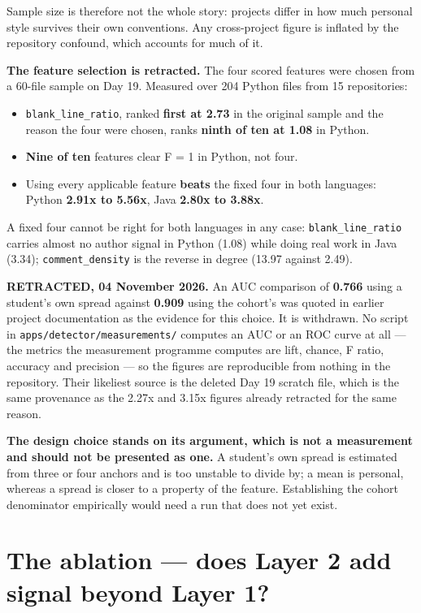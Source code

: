 Sample size is therefore not the whole story: projects differ in how
much personal style survives their own conventions. Any cross-project
figure is inflated by the repository confound, which accounts for much
of it.

\textbf{The feature selection is retracted.} The four scored features
were chosen from a 60-file sample on Day 19. Measured over 204 Python
files from 15 repositories:

\begin{itemize}
\tightlist
\item
  \texttt{blank\_line\_ratio}, ranked \textbf{first at 2.73} in the
  original sample and the reason the four were chosen, ranks
  \textbf{ninth of ten at 1.08} in Python.
\item
  \textbf{Nine of ten} features clear F = 1 in Python, not four.
\item
  Using every applicable feature \textbf{beats} the fixed four in both
  languages: Python \textbf{2.91x to 5.56x}, Java \textbf{2.80x to
  3.88x}.
\end{itemize}

A fixed four cannot be right for both languages in any case:
\texttt{blank\_line\_ratio} carries almost no author signal in Python
(1.08) while doing real work in Java (3.34); \texttt{comment\_density}
is the reverse in degree (13.97 against 2.49).

\textbf{RETRACTED, 04 November 2026.} An AUC comparison of
\textbf{0.766} using a student's own spread against \textbf{0.909} using
the cohort's was quoted in earlier project documentation as the evidence
for this choice. It is withdrawn. No script in
\texttt{apps/detector/measurements/} computes an AUC or an ROC curve at
all --- the metrics the measurement programme computes are lift, chance,
F ratio, accuracy and precision --- so the figures are reproducible from
nothing in the repository. Their likeliest source is the deleted Day 19
scratch file, which is the same provenance as the 2.27x and 3.15x
figures already retracted for the same reason.

\textbf{The design choice stands on its argument, which is not a
measurement and should not be presented as one.} A student's own spread
is estimated from three or four anchors and is too unstable to divide
by; a mean is personal, whereas a spread is closer to a property of the
feature. Establishing the cohort denominator empirically would need a
run that does not yet exist.

\hypertarget{the-ablation-does-layer-2-add-signal-beyond-layer-1}{%
\section{The ablation --- does Layer 2 add signal beyond Layer
1?}\label{the-ablation-does-layer-2-add-signal-beyond-layer-1}}

